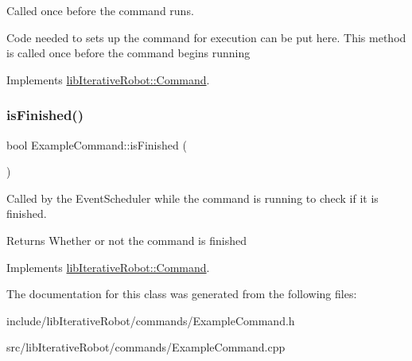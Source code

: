 Called once before the command runs. 

Code needed to sets up the command for execution can be put here. This method is called once before the command begins running 

Implements \mbox{\hyperlink{classlib_iterative_robot_1_1_command_a14543c9d38b07e52f9ffb2af88a63f60}{lib\+Iterative\+Robot\+::\+Command}}.

\mbox{\label{class_example_command_ab4e52d526bda7fe22705b2d3c44286e0}} 
\subsubsection{\texorpdfstring{isFinished()}{isFinished()}}
{\footnotesize\ttfamily bool Example\+Command\+::is\+Finished (\begin{DoxyParamCaption}{ }\end{DoxyParamCaption})\hspace{0.3cm}{\ttfamily [virtual]}}



Called by the Event\+Scheduler while the command is running to check if it is finished. 

\begin{DoxyReturn}{Returns}
Whether or not the command is finished 
\end{DoxyReturn}


Implements \mbox{\hyperlink{classlib_iterative_robot_1_1_command_a8e4dccdd88f432a716090f532ba097f7}{lib\+Iterative\+Robot\+::\+Command}}.



The documentation for this class was generated from the following files\+:\begin{DoxyCompactItemize}
\item 
include/lib\+Iterative\+Robot/commands/Example\+Command.\+h\item 
src/lib\+Iterative\+Robot/commands/Example\+Command.\+cpp\end{DoxyCompactItemize}
